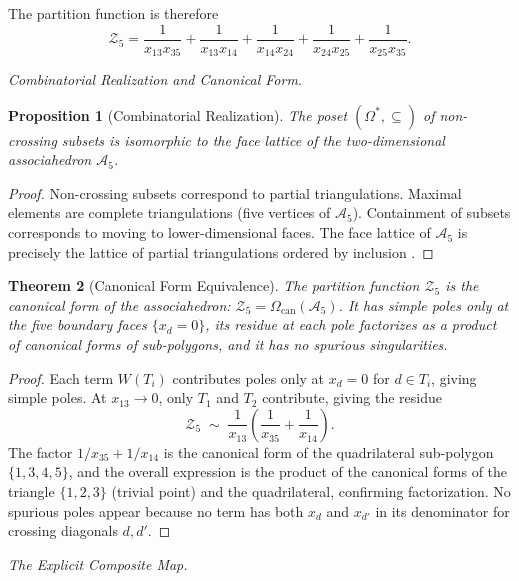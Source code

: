 \documentclass[11pt]{article}
\theoremstyle{plain}
\newtheorem{theorem}{Theorem}[section]
\newtheorem{proposition}[theorem]{Proposition}
\theoremstyle{definition}
\theoremstyle{remark}
\newcommand{\OmKS}{\Omega}
\begin{document}
The partition function is therefore
\begin{equation}
\label{eq:pentagon-Z}
  \mathcal{Z}_5 = \frac{1}{x_{13}x_{35}} + \frac{1}{x_{13}x_{14}} + \frac{1}{x_{14}x_{24}} + \frac{1}{x_{24}x_{25}} + \frac{1}{x_{25}x_{35}}.
\end{equation}

\medskip\noindent\textit{Combinatorial Realization and Canonical Form.}

\begin{proposition}[Combinatorial Realization]
The poset $(\OmKS^*, \subseteq)$ of non-crossing subsets is isomorphic to the face lattice of the two-dimensional associahedron $\mathcal{A}_5$.
\end{proposition}

\begin{proof}
Non-crossing subsets correspond to partial triangulations. Maximal elements are complete triangulations (five vertices of $\mathcal{A}_5$). Containment of subsets corresponds to moving to lower-dimensional faces. The face lattice of $\mathcal{A}_5$ is precisely the lattice of partial triangulations ordered by inclusion \cite{Stasheff1963}.
\end{proof}

\begin{theorem}[Canonical Form Equivalence]
The partition function $\mathcal{Z}_5$ is the canonical form of the associahedron: $\mathcal{Z}_5 = \Omega_{\mathrm{can}}(\mathcal{A}_5)$. It has simple poles only at the five boundary faces $\{x_d = 0\}$, its residue at each pole factorizes as a product of canonical forms of sub-polygons, and it has no spurious singularities.
\end{theorem}

\begin{proof}
Each term $W(T_i)$ contributes poles only at $x_d = 0$ for $d \in T_i$, giving simple poles. At $x_{13} \to 0$, only $T_1$ and $T_2$ contribute, giving the residue
\[
  \mathcal{Z}_5 \;\sim\; \frac{1}{x_{13}} \left(\frac{1}{x_{35}} + \frac{1}{x_{14}}\right).
\]
The factor $1/x_{35} + 1/x_{14}$ is the canonical form of the quadrilateral sub-polygon $\{1,3,4,5\}$, and the overall expression is the product of the canonical forms of the triangle $\{1,2,3\}$ (trivial point) and the quadrilateral, confirming factorization. No spurious poles appear because no term has both $x_d$ and $x_{d'}$ in its denominator for crossing diagonals $d, d'$.
\end{proof}

\medskip\noindent\textit{The Explicit Composite Map.}
\end{document}
